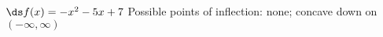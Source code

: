 {$\ds f(x) = -x^2-5x+7$
}
{Possible points of inflection: none;
concave down on $(-\infty,\infty)$
}
